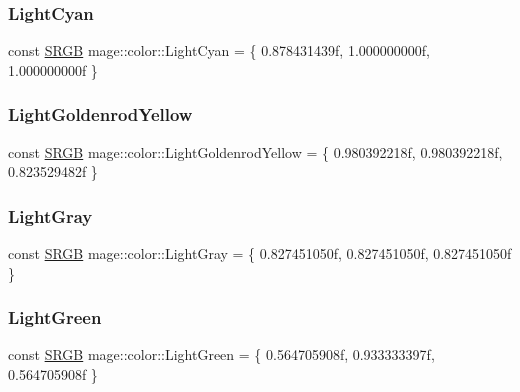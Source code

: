 \subsubsection{\texorpdfstring{Light\+Cyan}{LightCyan}}
{\footnotesize\ttfamily const \hyperlink{structmage_1_1_s_r_g_b}{S\+R\+GB} mage\+::color\+::\+Light\+Cyan = \{ 0.\+878431439f, 1.\+000000000f, 1.\+000000000f \}}

\hypertarget{namespacemage_1_1color_a449666185e7f1aa661bf1e873d3d5660}{}\label{namespacemage_1_1color_a449666185e7f1aa661bf1e873d3d5660} 
\subsubsection{\texorpdfstring{Light\+Goldenrod\+Yellow}{LightGoldenrodYellow}}
{\footnotesize\ttfamily const \hyperlink{structmage_1_1_s_r_g_b}{S\+R\+GB} mage\+::color\+::\+Light\+Goldenrod\+Yellow = \{ 0.\+980392218f, 0.\+980392218f, 0.\+823529482f \}}

\hypertarget{namespacemage_1_1color_ad9a55cd211c48c9434a59a402f08f5f3}{}\label{namespacemage_1_1color_ad9a55cd211c48c9434a59a402f08f5f3} 
\subsubsection{\texorpdfstring{Light\+Gray}{LightGray}}
{\footnotesize\ttfamily const \hyperlink{structmage_1_1_s_r_g_b}{S\+R\+GB} mage\+::color\+::\+Light\+Gray = \{ 0.\+827451050f, 0.\+827451050f, 0.\+827451050f \}}

\hypertarget{namespacemage_1_1color_a4bea2b8dc8f28cfabe9a9bc1c17d1f12}{}\label{namespacemage_1_1color_a4bea2b8dc8f28cfabe9a9bc1c17d1f12} 
\subsubsection{\texorpdfstring{Light\+Green}{LightGreen}}
{\footnotesize\ttfamily const \hyperlink{structmage_1_1_s_r_g_b}{S\+R\+GB} mage\+::color\+::\+Light\+Green = \{ 0.\+564705908f, 0.\+933333397f, 0.\+564705908f \}}

\hypertarget{namespacemage_1_1color_abaad6ea2e021daadbf0c786fdc67d87c}{}\label{namespacemage_1_1color_abaad6ea2e021daadbf0c786fdc67d87c} 
